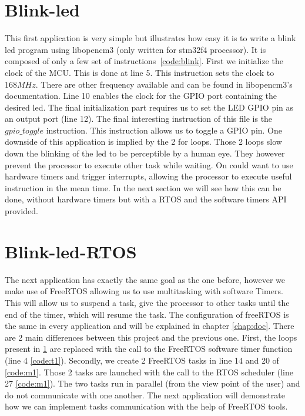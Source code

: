 \documentclass[12pt,a4paper]{report}
\begin{document}
\section{Blink-led}
\label{sec:bl}
This first application is very simple but illustrates how easy it is to write a blink led program using libopencm3 (only written for stm32f4 processor). It is composed of only a few set of instructions~\ref{code:blink}. First we initialize the clock of the MCU. This is done at line 5. This instruction sets the clock to $168MHz$. There are other frequency available and can be found in libopencm3's documentation. Line 10 enables the clock for the GPIO port containing the desired led. The final initialization part requires us to set the LED GPIO pin as an output port (line 12).\newline
The final interesting instruction of this file is the $gpio\_toggle$ instruction. This instruction allows us to toggle a GPIO pin. 
One downside of this application is implied by the 2 for loops. Those 2 loops slow down the blinking of the led to be perceptible by a human eye. They however prevent the processor to execute other task while waiting. On could want to use hardware timers and trigger interrupts, allowing the processor to execute useful instruction in the mean time. In the next section we will see how this can be done, without hardware timers but with a RTOS and the software timers API provided.
\section{Blink-led-RTOS}
\label{sec:blr}
The next application has exactly the same goal as the one before, however we make use of FreeRTOS allowing us to use multitasking with software Timers. This will allow us to suspend a task, give the processor to other tasks until the end of the timer, which will resume the task. The configuration of freeRTOS is the same in every application and will be explained in chapter \ref{chap:doc}. There are 2 main differences between this project and the previous one. First, the loops present in \ref{sec:bl} are replaced with the call to the FreeRTOS software timer function (line 4 \ref{code:t1}). Secondly, we create 2 FreeRTOS tasks in line 14 and 20 of \ref{code:m1}. Those 2 tasks are launched with the call to the RTOS scheduler (line 27 \ref{code:m1}). The two tasks run in parallel (from the view point of the user) and do not communicate with one another. The next application will demonstrate how we can implement tasks communication with the help of FreeRTOS tools. 
\end{document}

